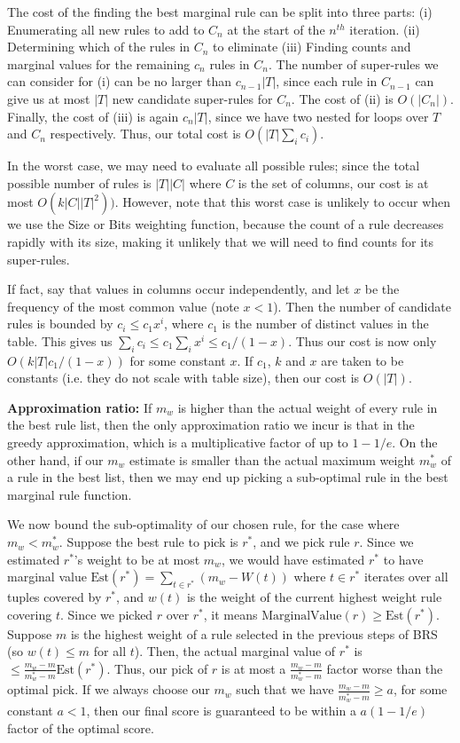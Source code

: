 \documentclass[10pt,journal,compsoc]{IEEEtran}
\begin{document}
The cost of the finding the best marginal rule can be split into three parts: (i) Enumerating all new rules to add to $C_n$ at the start of the $n^{th}$ iteration. (ii) Determining which of the rules in $C_n$ to eliminate (iii) Finding counts and marginal values for the remaining $c_n$ rules in $C_n$. The number of super-rules we can consider for (i) can be no larger than $c_{n-1}|T|$, since each rule in $C_{n-1}$ can give us at most $|T|$ new candidate super-rules for $C_n$. The cost of (ii) is $O(|C_n|)$. Finally, the cost of (iii) is again $c_n|T|$, since we have two nested for loops over $T$ and $C_n$ respectively. Thus, our total cost is $O(|T|\sum_i c_i)$.

In the worst case, we may need to evaluate all possible rules; since the total possible number of rules is $|T||C|$ where $C$ is the set of columns, our cost is at most $O(k|C||T|^2))$. However, note that this worst case is unlikely to occur when we use the Size or Bits weighting function, because the count of a rule decreases rapidly with its size, making it unlikely that we will need to find counts for its super-rules.

If fact, say that values in columns occur independently, and let $x$ be the frequency of the most common value (note $x<1$). Then the number of candidate rules is bounded by $c_i \le c_1 x^i$, where $c_1$ is the number of distinct values in the table. This gives us $\sum_i c_i \leq c_1\sum_i x^i \leq c_1/(1-x)$.
Thus our cost is now only $O(k|T|c_1/(1-x))$ for some constant $x$. If $c_1$, $k$ and $x$ are taken to be constants (i.e. they do not scale with table size), then our cost is $O(|T|)$.

\noindent
\textbf{Approximation ratio:}
If $m_w$ is higher than the actual weight of every rule in the best rule list, then the only approximation ratio we incur is that in the greedy approximation, which is a multiplicative factor of up to $1 - 1/e$. On the other hand, if our $m_w$ estimate is smaller than the actual maximum weight $m_w^*$ of a rule in the best list, then we may end up picking a sub-optimal rule in the best marginal rule function.

We now bound the sub-optimality of our chosen rule, for the case where $m_w < m_w^*$. Suppose the best rule to pick is $r^*$, and we pick rule $r$. Since we estimated $r^*$'s weight to be at most $m_w$, we would have estimated $r^*$ to have marginal value $\text{Est}(r^*) = \sum_{t \in r^*}(m_w - W(t))$ where $t \in r^*$ iterates over all tuples covered by $r^*$, and $w(t)$ is the weight of the current highest weight rule covering $t$. Since we picked $r$ over $r^*$, it means $\text{MarginalValue}(r) \geq \text{Est}(r^*)$. Suppose $m$ is the highest weight of a rule selected in the previous steps of BRS (so $w(t) \leq m$ for all $t$). Then, the actual marginal value of $r^*$ is $\leq \frac{m_w - m}{m_w^* - m}\text{Est}(r^*)$. Thus, our pick of $r$ is at most a $\frac{m_w - m}{m_w^* - m}$ factor worse than the optimal pick. If we always choose  our $m_w$ such that we have $\frac{m_w - m}{m_w^* - m} \geq a$, for some constant $a < 1$, then our final score is guaranteed to be within a $a(1-1/e)$ factor of the optimal score.
\end{document}
